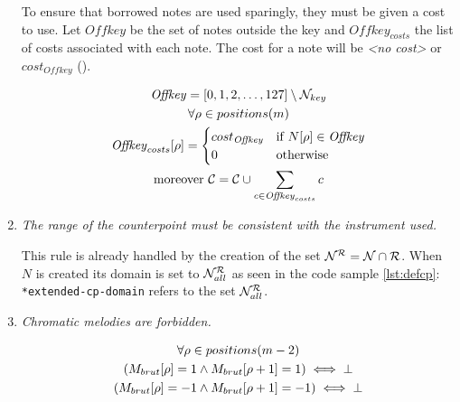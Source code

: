 \begin{enumerate}[wide, label=\bfseries G\arabic*]
    To ensure that borrowed notes are used sparingly, they must be given a cost to use. Let $\mathit{Offkey}$ be the set of notes outside the key and $\mathit{Offkey}_{costs}$ the list of costs associated with each note. The cost for a note will be \textit{<no cost>} or $cost_{\mathit{Offkey}}$ ().

    \begin{equation}
        \begin{gathered}
            \mathit{Offkey} = [0, 1, 2, \dots, 127] \setminus \mathcal{N}_{key}\\
            \forall \rho \in positions(m)\\
            \mathit{Offkey}_{costs}[\rho] = \begin{cases}
                cost_{\mathit{Offkey}} & \text{if } N[\rho] \in \mathit{Offkey} \\
                0 & \text{otherwise}
            \end{cases}\\
            \text{moreover } \mathcal{C} = \mathcal{C} \cup \sum _{c \in \mathit{Offkey}_{costs}} c
        \end{gathered}
    \end{equation}

    \item \textit{The range of the counterpoint must be consistent with the instrument used.} \label{rule:instrurange}

    This rule is already handled by the creation of the set $\mathcal{N}^{\mathcal{R}} = \mathcal{N} \cap \mathcal{R}$. When $N$ is created its domain is set to $\mathcal{N}_{all}^{\mathcal{R}}$ as seen in the code sample \ref{lst:defcp}: \texttt{*extended-cp-domain} refers to the set $\mathcal{N}_{all}^{\mathcal{R}}$.

    \item \textit{Chromatic melodies are forbidden.}\label{rule:chromafb}

    \begin{equation}
        \begin{gathered}
            \forall \rho \in positions(m-2)\\
            (M_{brut}[\rho] = 1 \land M_{brut}[\rho+1] = 1) \iff \bot\\
            (M_{brut}[\rho] = -1 \land M_{brut}[\rho+1] = -1) \iff \bot\\
        \end{gathered}
    \end{equation}
    

\end{enumerate}
